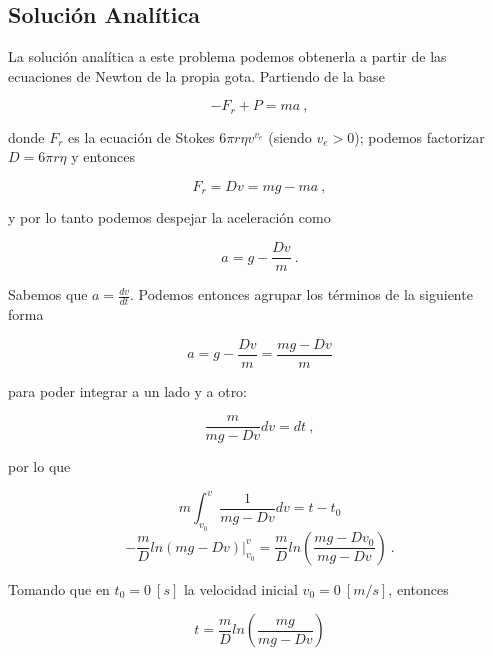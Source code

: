 \documentclass[journal]{IEEEtran}
\begin{document}
\subsection{Solución Analítica}

La solución analítica a este problema podemos obtenerla a partir de las ecuaciones de Newton de la propia gota. Partiendo de la base

\begin{equation}
- F_r + P = m a~,
\end{equation}

donde $F_r$ es la ecuación de Stokes $6\pi r \eta v^{v_e}$ (siendo $v_e > 0$); podemos factorizar $D = 6\pi r \eta$ y entonces

\begin{equation}
  F_r = Dv = mg - ma~,
\end{equation}

y por lo tanto podemos despejar la aceleración como

\begin{equation}
  a = g - \displaystyle\frac{Dv}{m}~.
\end{equation}

Sabemos que $a = \displaystyle\frac{dv}{dt}$. Podemos entonces agrupar los términos de la siguiente forma

\begin{equation}
  a = g - \displaystyle\frac{Dv}{m} = \displaystyle\frac{mg - Dv}{m}
\end{equation}

para poder integrar a un lado y a otro:

\begin{equation}
  \displaystyle\frac{m}{mg - Dv} dv = dt~,
\end{equation}

por lo que

\begin{equation}
  m \int_{v_0}^v \displaystyle\frac{1}{mg - Dv}dv = t - t_0
\end{equation}
\begin{equation}
  - \displaystyle\frac{m}{D} ln(mg - Dv)|^v_{v_0} = \displaystyle\frac{m}{D}ln\left(\displaystyle\frac{mg - Dv_0}{mg - Dv}\right)~.
\end{equation}

Tomando que en $t_0 = 0~[s]$ la velocidad inicial $v_0 = 0~[m/s]$, entonces

\begin{equation}
  t = \displaystyle\frac{m}{D} ln \left(\displaystyle\frac{mg}{mg - Dv}\right)
\end{equation}
\end{document}
